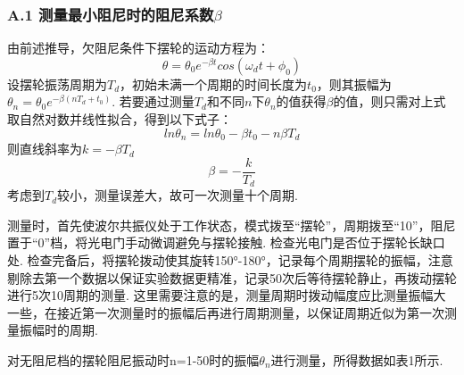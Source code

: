 \documentclass[UTF8]{ctexart}
\begin{document}
\subsubsection*{A.1 测量最小阻尼时的阻尼系数$\beta$}
由前述推导，欠阻尼条件下摆轮的运动方程为：
\begin{equation}
\theta=\theta_0e^{-\beta t}cos(\omega_d t+\phi_0)
\label{qianzuni}
\end{equation}
设摆轮振荡周期为$T_d$，初始未满一个周期的时间长度为$t_0$，则其振幅为$\theta_n=\theta_0e^{-\beta(nT_d+t_0)}$. 若要通过测量$T_d$和不同$n$下$\theta_n$的值获得$\beta$的值，则只需对上式取自然对数并线性拟合，得到以下式子：
\begin{equation}
ln\theta_n=ln\theta_0-\beta t_0-n\beta T_d
\end{equation}
则直线斜率为$k=-\beta T_d$
\begin{equation}
\beta=-\frac{k}{T_d}
\end{equation}
考虑到$T_d$较小，测量误差大，故可一次测量十个周期. \par
测量时，首先使波尔共振仪处于工作状态，模式拨至“摆轮”，周期拨至“10”，阻尼置于“0”档，将光电门手动微调避免与摆轮接触. 检查光电门是否位于摆轮长缺口处. 检查完备后，将摆轮拨动使其旋转150°-180°，记录每个周期摆轮的振幅，注意剔除去第一个数据以保证实验数据更精准，记录50次后等待摆轮静止，再拨动摆轮进行5次10周期的测量. 这里需要注意的是，测量周期时拨动幅度应比测量振幅大一些，在接近第一次测量时的振幅后再进行周期测量，以保证周期近似为第一次测量振幅时的周期.\par
对无阻尼档的摆轮阻尼振动时n=1-50时的振幅$\theta_n$进行测量，所得数据如表1所示. 
\end{document}
